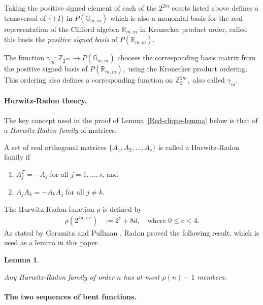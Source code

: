 \documentclass[12pt,a4paper]{article}
\newcommand{\mb}[1]{\mathbb{#1}}
\newcommand{\G}{\mb{G}}
\newcommand{\R}{\mb{R}}
\newcommand{\Z}{\mb{Z}}
\newcommand{\Rep}{P}
\newcommand{\To}{\rightarrow}
\newtheorem{Lemma}{Lemma}
\newtheorem{Definition}{Definition}
\begin{document}
Taking the positive signed element of each of the $2^{2m}$ cosets listed above
defines a transversal of $\{\pm I\}$ in $\Rep(\G_{m,m})$
which is also a monomial basis for the real representation of the Clifford algebra $\R_{m,m}$ in 
Kronecker product order,
called this basis the \emph{positive signed basis} of $\Rep(\R_{m,m}).$ 

The function $\gamma_m : \Z_{2^{2 m}} \To \Rep(\G_{m,m})$ 
chooses the corresponding basis matrix from the positive signed basis of $\Rep(\R_{m,m}),$
using the Kronecker product ordering.
This ordering also defines a corresponding function on $\Z_2^{2 m},$
also called $\gamma_m.$

\paragraph*{Hurwitz-Radon theory.}
\label{sec-Hurwitz-Radon}
The key concept used in the proof of Lemma~\ref{Red-clique-lemma} below is that of a \emph{Hurwitz-Radon family} of matrices.
~

A set of real orthogonal matrices $\{A_1,A_2,\ldots,A_s\}$ is called a Hurwitz-Radon family 
\cite{GerP74a,Hur22,Rad22} if
\begin{enumerate}
 \item
$A_j^T = -A_j$ for all $j=1,\ldots,s$, and
 \item 
$A_j A_k = -A_k A_j$ for all $j \neq k$.
\end{enumerate}
The Hurwitz-Radon function $\rho$ is defined by
\begin{align*}
\rho(2^{4 d + c}) &:= 2^c + 8 d, \quad \text{where~} 0 \leqslant c < 4.
\end{align*}
As stated by Geramita and Pullman \cite{GerP74a}, Radon \cite{Rad22}
proved the following result, which is used as a lemma in this paper.
\begin{Lemma}\label{Hurwitz-Radon-lemma}
\cite[Theorem A]{GerP74a}

Any Hurwitz-Radon family of order $n$ has at most $\rho(n)-1$ members.
\end{Lemma}

\paragraph*{The two sequences of bent functions.}
\label{sec-Bent}

~
\end{document}
